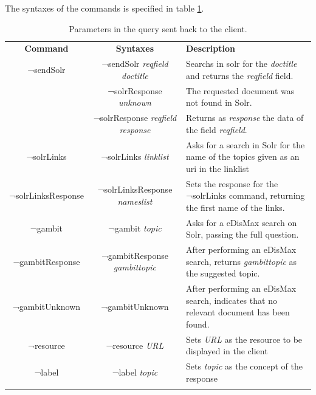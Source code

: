 The syntaxes of the commands is specified in table \ref{tab:oob-commands}.
\begin{center}
  \centering
  \begin{table}
    \begin{tabular*}{0.7\textwidth}{@{\extracolsep{\fill}} | c | c | p{} |}
      \hhline{|-|-|-|}
      \textbf{Command} & \textbf{Syntaxes} & \textbf{Description} \\ \hhline{|=|=|=|}
      ¬sendSolr & ¬sendSolr \textit{reqfield} \textit{doctitle} & Searchs in solr for the \textit{doctitle} and returns the \textit{reqfield} field.  \\ \hhline{|-|-|-|}
      \multirow{2}{*}{¬solrResponse} & ¬solrResponse \textit{unknown} & The requested document was not found in Solr. \\ \cline{2-3}
				     & ¬solrResponse \textit{reqfield} \textit{response} & Returns as \textit{response} the data of the field \textit{reqfield}. \\ \hhline{|-|-|-|}
      ¬solrLinks & ¬solrLinks \textit{linklist} & Asks for a search in Solr for the name of the topics given as an uri in the linklist \\ \hhline{|-|-|-|}
      ¬solrLinksResponse & ¬solrLinksResponse \textit{nameslist} & Sets the response for the ¬solrLinks command, returning the first name of the links. \\ \hhline{|-|-|-|}
      ¬gambit & ¬gambit \textit{topic}& Asks for a \ac{eDisMax} search on Solr, passing the full question. \\ \hhline{|-|-|-|}
      ¬gambitResponse & ¬gambitResponse \textit{gambittopic} & After performing an \ac{eDisMax} search, returns \textit{gambittopic} as the suggested topic. \\ \hhline{|-|-|-|}
      ¬gambitUnknown & ¬gambitUnknown & After performing an \ac{eDisMax} search, indicates that no relevant document has been found. \\ \hhline{|-|-|-|}
      ¬resource & ¬resource \textit{URL} & Sets \textit{URL} as the resource to be displayed in the client \\ \hhline{|-|-|-|}
      ¬label & ¬label \textit{topic} & Sets \textit{topic} as the concept of the response \\ \hhline{|-|-|-|}
      \end{tabular*}
    \caption{Parameters in the query sent back to the client.}
    \label{tab:oob-commands}
  \end{table}
\end{center}

